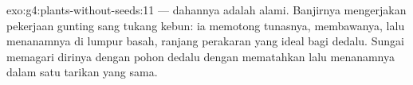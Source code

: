 \begin{solution}{exo:g4:plants-without-seeds:11}
 --- dahannya adalah  alami. Banjirnya
mengerjakan pekerjaan gunting sang tukang kebun: ia memotong tunasnya,
membawanya, lalu menanamnya di lumpur basah, ranjang perakaran yang
ideal bagi dedalu. Sungai memagari dirinya dengan pohon dedalu dengan
mematahkan lalu menanamnya dalam satu tarikan yang sama.
\end{solution}
